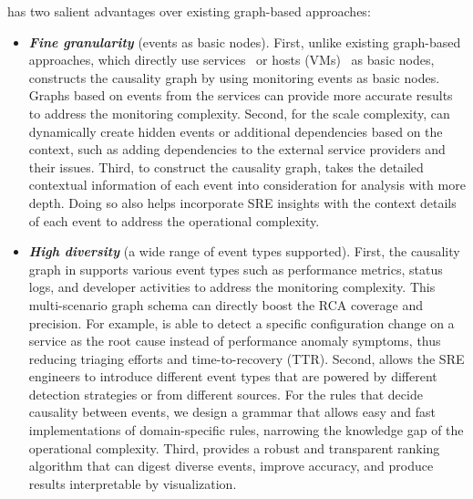 \system has two salient advantages over existing graph-based approaches:
\begin{itemize}
\item \emph{\textbf{Fine granularity}} (events as basic nodes). First, unlike existing graph-based approaches, which directly use services~\cite{brandon2020graph} or hosts (VMs)~\cite{weng2018root} as basic nodes, \system constructs the causality graph by using monitoring events as basic nodes. Graphs based on events from the services can provide more accurate results to address the monitoring complexity. Second, for the scale complexity, \system can dynamically create hidden events or additional dependencies based on the context, such as adding dependencies to the external service providers and their issues. Third, to construct the causality graph, \system takes the detailed contextual information of each event into consideration for analysis with more depth. Doing so also helps \system incorporate SRE insights with the context details of each event to address the operational complexity.
\item \emph {\textbf{High diversity}} (a wide range of event types supported). First, the causality graph in \system supports various event types such as performance metrics, status logs, and developer activities to address the monitoring complexity. This multi-scenario graph schema can directly boost the RCA coverage and precision. For example, \system is able to detect a specific configuration change on a service as the root cause instead of performance anomaly symptoms, thus reducing triaging efforts and time-to-recovery (TTR). Second, \system allows the SRE engineers to introduce different event types that are powered by different detection strategies or from different sources. For the rules that decide causality between events, we design a grammar that allows easy and fast implementations of domain-specific rules, narrowing the knowledge gap of the operational complexity. Third, \system provides a robust and transparent ranking algorithm that can digest diverse events, improve accuracy, and produce results interpretable by visualization. 

\end{itemize}
